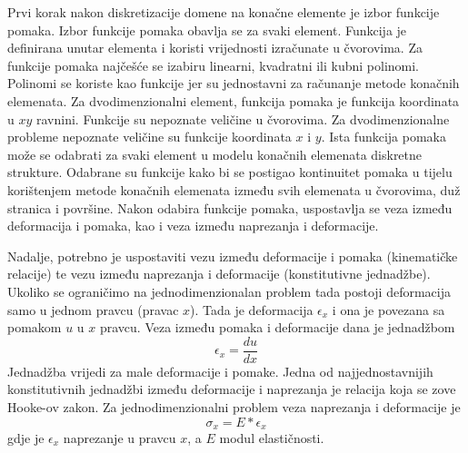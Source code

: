 \documentclass[a4paper,twoside,12pt]{memoir} %
\begin{document}
Prvi korak nakon diskretizacije domene na konačne elemente je izbor funkcije pomaka. Izbor funkcije pomaka obavlja se za svaki element. Funkcija je definirana unutar elementa i koristi vrijednosti izračunate u čvorovima. Za funkcije pomaka najčešće se izabiru linearni, kvadratni ili kubni polinomi. Polinomi se koriste kao funkcije jer su jednostavni za računanje metode konačnih elemenata. Za dvodimenzionalni element, funkcija pomaka je funkcija koordinata u $xy$ ravnini. Funkcije su nepoznate veličine u čvorovima. Za dvodimenzionalne probleme nepoznate veličine su funkcije koordinata $x$ i $y$.
Ista funkcija pomaka može se odabrati za svaki element u modelu konačnih elemenata diskretne strukture. Odabrane su funkcije kako bi se postigao kontinuitet pomaka u tijelu korištenjem metode konačnih elemenata između svih elemenata u čvorovima, duž stranica i površine. Nakon odabira funkcije pomaka, uspostavlja se veza između deformacija i pomaka, kao i veza između naprezanja i deformacije. \par

Nadalje, potrebno je uspostaviti vezu između deformacije i pomaka (kinematičke relacije) te vezu između naprezanja i deformacije (konstitutivne jednadžbe). Ukoliko se ograničimo na jednodimenzionalan problem tada postoji deformacija samo u jednom pravcu (pravac $x$). Tada je deformacija $\epsilon_x$ i ona je povezana sa pomakom $u$ u $x$ pravcu. Veza između pomaka i deformacije dana je jednadžbom
\begin{equation}
    \label{eq:veza_pomaka_deformacije}
	\epsilon_x = \frac{du}{dx}
\end{equation}
Jednadžba vrijedi za male deformacije i pomake. Jedna od najjednostavnijih konstitutivnih jednadžbi između deformacije i naprezanja je relacija koja se zove Hooke-ov zakon. Za jednodimenzionalni problem veza naprezanja i deformacije je 
\begin{equation}
    \label{eq:veza_naprezanja_deformacije}
    \sigma_x = E * \epsilon_x
\end{equation}
gdje je $\epsilon_x$ naprezanje u pravcu $x$, a $E$ modul elastičnosti. \par
\end{document}
